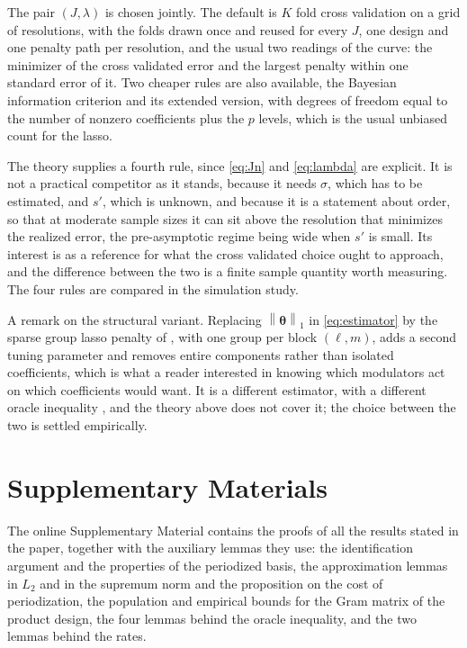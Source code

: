 \documentclass[12pt]{article} %
\theoremstyle{definition}
\newcommand{\norm}[1]{\left\lVert #1 \right\rVert}
\newcommand{\cv}{\ell}
\newcommand{\md}{m}
\newcommand{\btheta}{\boldsymbol{\theta}}
\newcommand{\pen}{\lambda}
\newcommand{\seff}{s'}
\begin{document}
The pair $(J,\pen)$ is chosen jointly. The default is $K$ fold cross
validation on a grid of resolutions, with the folds drawn once and reused for
every $J$, one design and one penalty path per resolution, and the usual two
readings of the curve: the minimizer of the cross validated error and the
largest penalty within one standard error of it. Two cheaper rules are also
available, the Bayesian information criterion and its extended version, with
degrees of freedom equal to the number of nonzero coefficients plus the $p$
levels, which is the usual unbiased count for the lasso.

The theory supplies a fourth rule, since \eqref{eq:Jn} and \eqref{eq:lambda}
are explicit. It is not a practical competitor as it stands, because it needs
$\sigma$, which has to be estimated, and $\seff$, which is unknown, and
because it is a statement about order, so that at moderate sample sizes it can
sit above the resolution that minimizes the realized error, the pre-asymptotic
regime being wide when $\seff$ is small. Its interest is as a reference for
what the cross validated choice ought to approach, and the difference between
the two is a finite sample quantity worth measuring. The four rules are
compared in the simulation study.

A remark on the structural variant. Replacing $\norm{\btheta}_1$ in
\eqref{eq:estimator} by the sparse group lasso penalty of
\citet{Simon-Friedman-Hastie-Tibshirani-2013}, with one group per block
$(\cv,\md)$, adds a second tuning parameter and removes entire components
rather than isolated coefficients, which is what a reader interested in
knowing which modulators act on which coefficients would want. It is a
different estimator, with a different oracle inequality
\citep{Lounici-Pontil-vandeGeer-Tsybakov-2011}, and the theory above does not
cover it; the choice between the two is settled empirically.

\section*{Supplementary Materials}

The online Supplementary Material contains the proofs of all the results
stated in the paper, together with the auxiliary lemmas they use: the
identification argument and the properties of the periodized basis, the
approximation lemmas in $L_2$ and in the supremum norm and the proposition on
the cost of periodization, the population and empirical bounds for the Gram
matrix of the product design, the four lemmas behind the oracle inequality,
and the two lemmas behind the rates.
\end{document}
